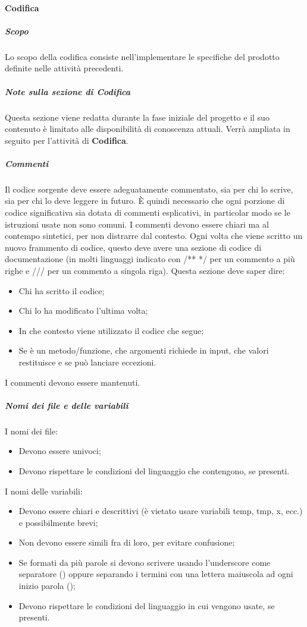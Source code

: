 \paragraph{Codifica}
\subparagraph*{Scopo}
Lo scopo della codifica consiste nell'implementare le specifiche del prodotto definite nelle attività precedenti.

\subparagraph*{Note sulla sezione di Codifica}
Questa sezione viene redatta durante la fase iniziale del progetto e il suo contenuto è limitato alle disponibilità di conoscenza attuali.
Verrà ampliata in seguito per l'attività di \textbf{Codifica}.

\subparagraph*{Commenti}
Il codice sorgente deve essere adeguatamente commentato, sia per chi lo scrive, sia per chi lo deve leggere in futuro.
È quindi necessario che ogni porzione di codice significativa sia dotata di commenti esplicativi, in particolar modo se le istruzioni usate non sono comuni.
I commenti devono essere chiari ma al contempo sintetici, per non distrarre dal contesto.
Ogni volta che viene scritto un nuovo frammento di codice, questo deve avere una sezione di codice di documentazione (in molti linguaggi indicato con /** */ per un commento a più righe e /// per un commento a singola riga).
Questa sezione deve saper dire:
\begin{itemize}
    \item Chi ha scritto il codice;
    \item Chi lo ha modificato l'ultima volta;
    \item In che contesto viene utilizzato il codice che segue;
    \item Se è un metodo/funzione, che argomenti richiede in input, che valori restituisce e se può lanciare eccezioni.
\end{itemize}
I commenti devono essere mantenuti.

\subparagraph*{Nomi dei file e delle variabili}
I nomi dei file:
\begin{itemize}
    \item Devono essere univoci;
    \item Devono rispettare le condizioni del linguaggio che contengono, se presenti.
\end{itemize}
I nomi delle variabili:
\begin{itemize}
    \item Devono essere chiari e descrittivi (è vietato usare variabili temp, tmp, x, ecc.) e possibilmente brevi;
    \item Non devono essere simili fra di loro, per evitare confusione;
    \item Se formati da più parole si devono scrivere usando l'underscore come separatore () oppure separando i termini con una lettera maiuscola ad ogni inizio parola ();
    \item Devono rispettare le condizioni del linguaggio in cui vengono usate, se presenti.
\end{itemize}

